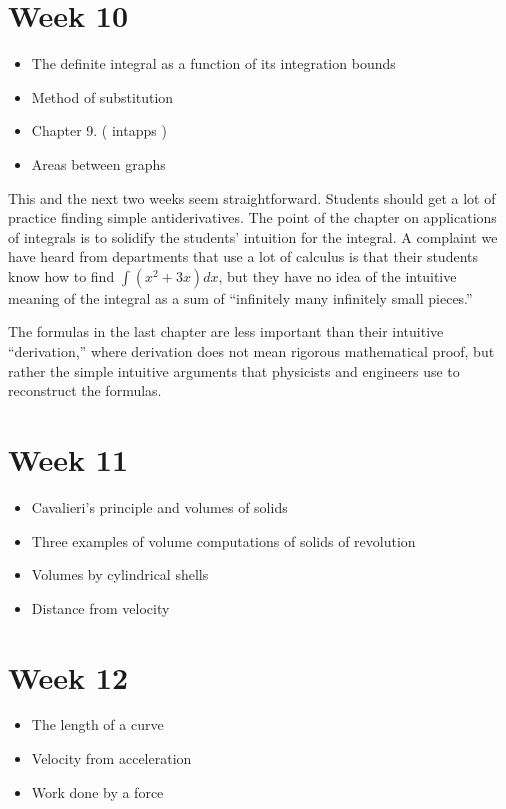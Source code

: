 \documentclass{amsproc}
\begin{document}
\section*{Week 10}
\begin{itemize}
\item The definite integral as a function of its integration bounds
\item Method of substitution
\item Chapter 9. ( intapps )
\item Areas between graphs
\end{itemize}
This and the next two weeks seem straightforward.  Students should get a lot of
practice finding simple antiderivatives.
The point of the chapter on applications of integrals is to solidify the
students' intuition for the integral.  A complaint we have heard from
departments that use a lot of calculus is that their students know how to find
$\int (x^2+3x) dx$, but they have no idea of the intuitive meaning of the
integral as a sum of ``infinitely many infinitely small pieces.''

The formulas in the last chapter are less important than their intuitive
``derivation,''  where derivation does not mean rigorous mathematical proof, but
rather the simple intuitive arguments that physicists and engineers use to
reconstruct the formulas.

\section*{Week 11}
\begin{itemize}
\item Cavalieri's principle and volumes of solids
\item Three examples of volume computations of solids of revolution
\item Volumes by cylindrical shells
\item Distance from velocity
\end{itemize}

\section*{Week 12}
\begin{itemize}
\item The length of a curve
\item Velocity from acceleration
\item Work done by a force
\end{itemize}
\end{document}
